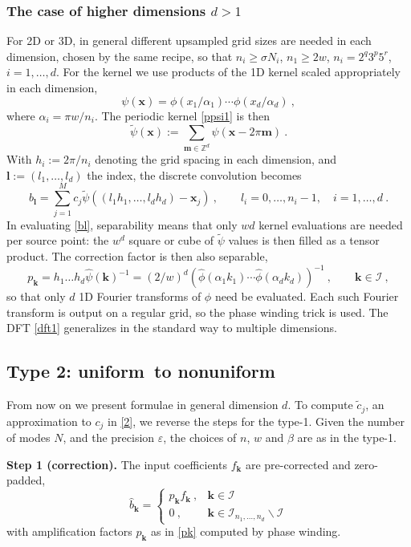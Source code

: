 \documentclass[10pt]{article}
\newcommand{\be}{\begin{equation}}
\newcommand{\ee}{\end{equation}}
\newcommand{\mbf}[1]{{\mathbf #1}}
\newcommand{\ZZ}{\mathbb{Z}}
\newcommand{\eps}{\varepsilon}
\newcommand{\xx}{\mbf{x}}
\newcommand{\kk}{\mbf{k}}
\newcommand{\KK}{{\mathcal I}}     %
\newcommand{\rat}{\sigma}          %
\newcommand{\ppsi}{{\tilde\psi}}   %
\newcommand{\al}{\alpha}           %
\newcommand{\NU}{{nonuniform}}       %
\newcommand{\U}{{uniform}}
\begin{document}
\subsubsection{The case of higher dimensions $d>1$}

For 2D or 3D, in general different
upsampled grid sizes are needed in each dimension,
chosen by the same recipe, so that $n_i \ge \rat N_i$, $n_1 \ge 2w$,
$n_i = 2^q3^p5^r$, $i=1,\dots,d$.
For the kernel we use products of the 1D kernel scaled appropriately
in each dimension,
\be
\psi(\xx) = \phi(x_1/\al_1) \cdots \phi(x_d/\al_d)
~,
\ee
where $\al_i=\pi w/n_i$.
The periodic kernel \eqref{ppsi1} is then
\be
\ppsi(\xx) := \sum_{\mbf{m} \in \ZZ^d} \psi(\xx - 2\pi\mbf{m})
~.
\label{ppsi}
\ee
With $h_i:=2\pi/n_i$ denoting the grid spacing in each dimension,
and $\mbf{l}:=(l_1,\dots,l_d)$ the index,
the discrete convolution %
becomes
\be
b_\mbf{l} = \sum_{j=1}^M c_j \ppsi((l_1h_1,\dots,l_dh_d)-\xx_j)~,
\qquad l_i=0,\dots,n_i-1, \quad i=1,\dots,d
~.
\label{bl}
\ee
In evaluating \eqref{bl}, separability
means that only $wd$ kernel evaluations are needed per source point:
the $w^d$ square or cube of $\ppsi$ values is then filled as a tensor product.
The correction factor is then also separable,
\be
p_\kk = h_1\dots h_d \hat\psi(\kk)^{-1} = (2/w)^{d}
(\hat\phi(\al_1 k_1) \cdots \hat\phi(\al_d k_d))^{-1}
~, \qquad \kk \in \KK~,
\label{pk}
\ee
so that only $d$ 1D Fourier transforms of $\phi$ need be evaluated.
Each such Fourier transform is output on a regular grid, so the phase winding
trick is used.
The DFT \eqref{dft1} generalizes in the standard way to
multiple dimensions.



\subsection{Type 2: \U\ to \NU}
\label{s:2}

From now on we present formulae in general dimension $d$.
To compute $\tilde c_j$, an approximation to $c_j$ in \eqref{2},
we reverse the steps for the type-1.
Given the number of modes $N$, and the precision $\eps$,
the choices of $n$, $w$ and $\beta$ are as in the type-1.

{\bf Step 1 (correction).}
The input coefficients $f_\kk$ are pre-corrected and zero-padded,
\be
\hat b_\kk = \left\{\begin{array}{ll}p_\kk f_\kk~, & \kk \in \KK \\
0~, & \kk \in \KK_{n_1,\dots,n_d} \backslash \KK
\end{array}\right.
\ee
with amplification factors $p_\kk$ as in \eqref{pk} computed by phase winding.
\end{document}

